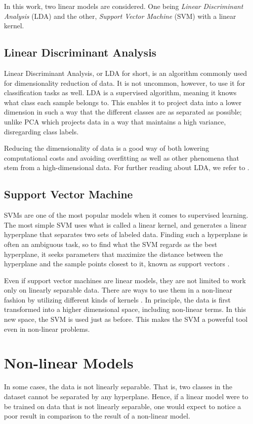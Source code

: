 In this work, two linear models are considered. One being \emph{Linear Discriminant Analysis} (LDA) and the other, \emph{Support Vector Machine} (SVM) with a linear kernel. 

\subsection*{Linear Discriminant Analysis}
Linear Discriminant Analysis, or LDA for short, is an algorithm commonly used for dimensionality reduction of data. \citep{raschka_2014} It is not uncommon, however, to use it for classification tasks as well. LDA is a supervised algorithm, meaning it knows what class each sample belongs to. This enables it to project data into a lower dimension in such a way that the different classes are as separated as possible; unlike PCA which projects data in a way that maintains a high variance, disregarding class labels. 

Reducing the dimensionality of data is a good way of both lowering computational costs and avoiding overfitting as well as other phenomena that stem from a high-dimensional data. For further reading about LDA, we refer to \citep{raschka_2014}.

\subsection*{Support Vector Machine}
SVMs are one of the most popular models when it comes to supervised learning. The most simple SVM uses what is called a linear kernel, and generates a linear hyperplane that separates two sets of labeled data. Finding such a hyperplane is often an ambiguous task, so to find what the SVM regards as the best hyperplane, it seeks parameters that maximize the distance between the hyperplane and the sample points closest to it, known as support vectors \citep{boswell2002introduction}.

Even if support vector machines are linear models, they are not limited to work only on linearly separable data. There are ways to use them in a non-linear fashion by utilizing different kinds of kernels \citep{xia_2016}. In principle, the data is first transformed into a higher dimensional space, including non-linear terms. In this new space, the SVM is used just as before. This makes the SVM a powerful tool even in non-linear problems.

\section{Non-linear Models}
In some cases, the data is not linearly separable. That is, two classes in the dataset cannot be separated by any hyperplane. Hence, if a linear model were to be trained on data that is not linearly separable, one would expect to notice a poor result in comparison to the result of a non-linear model. 

